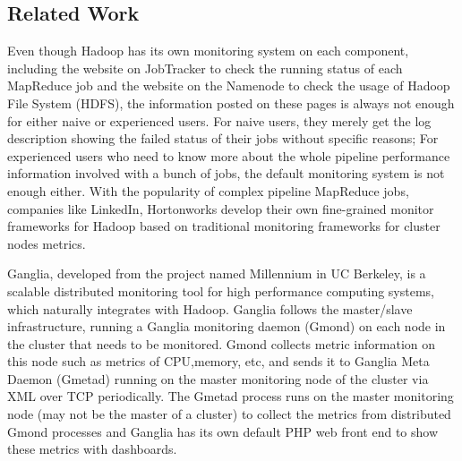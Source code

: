 \subsection{Related Work}
Even though Hadoop has its own monitoring system on each component, including the website on JobTracker to check the running status of each MapReduce job and the website on the Namenode to check the usage of Hadoop File System (HDFS), the information posted on these pages is always not enough for either naive or experienced users.
For naive users, they merely get the log description showing the failed status of their jobs without specific reasons; For experienced users who need to know more about the whole pipeline performance information involved with a bunch of jobs, the default monitoring system is not enough either.
With the popularity of complex pipeline MapReduce jobs, companies like LinkedIn, Hortonworks develop their own fine-grained monitor frameworks for Hadoop based on traditional monitoring frameworks for cluster nodes metrics.\par
Ganglia\cite{massie2004ganglia}, developed from the project named Millennium in UC Berkeley, is a scalable distributed monitoring tool for high performance computing systems, which naturally integrates with Hadoop.
Ganglia follows the master/slave infrastructure, running a Ganglia monitoring daemon (Gmond) on each node in the cluster that needs to be monitored.
Gmond collects metric information on this node such as metrics of CPU,memory, etc, and sends it to Ganglia Meta Daemon (Gmetad) running on the master monitoring node of the cluster via XML over TCP periodically.
The Gmetad process runs on the master monitoring node (may not be the master of a cluster) to collect the metrics from distributed Gmond processes and Ganglia has its own default PHP web front end to show these metrics with dashboards.


